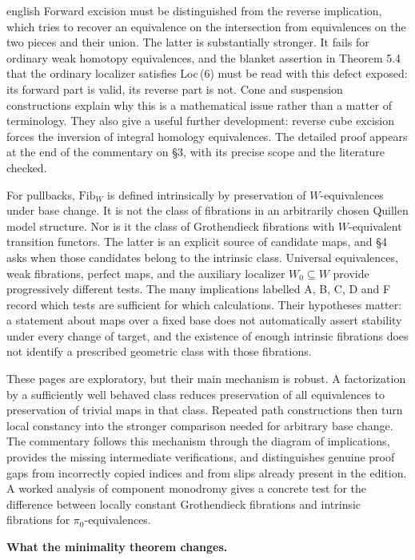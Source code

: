 \begin{otherlanguage*}{english}
Forward excision must be distinguished from the reverse implication, which tries to recover an equivalence on the intersection from equivalences on the two pieces and their union. The latter is substantially stronger. It fails for ordinary weak homotopy equivalences, and the blanket assertion in Theorem 5.4 that the ordinary localizer satisfies Loc\,(6) must be read with this defect exposed: its forward part is valid, its reverse part is not. Cone and suspension constructions explain why this is a mathematical issue rather than a matter of terminology. They also give a useful further development: reverse cube excision forces the inversion of integral homology equivalences. The detailed proof appears at the end of the commentary on \S3, with its precise scope and the literature checked.

For pullbacks, $\mathrm{Fib}_W$ is defined intrinsically by preservation of $W$-equivalences under base change. It is not the class of fibrations in an arbitrarily chosen Quillen model structure. Nor is it the class of Grothendieck fibrations with $W$-equivalent transition functors. The latter is an explicit source of candidate maps, and \S4 asks when those candidates belong to the intrinsic class. Universal equivalences, weak fibrations, perfect maps, and the auxiliary localizer $W_0\subseteq W$ provide progressively different tests. The many implications labelled A, B, C, D and F record which tests are sufficient for which calculations. Their hypotheses matter: a statement about maps over a fixed base does not automatically assert stability under every change of target, and the existence of enough intrinsic fibrations does not identify a prescribed geometric class with those fibrations.

These pages are exploratory, but their main mechanism is robust. A factorization by a sufficiently well behaved class reduces preservation of all equivalences to preservation of trivial maps in that class. Repeated path constructions then turn local constancy into the stronger comparison needed for arbitrary base change. The commentary follows this mechanism through the diagram of implications, provides the missing intermediate verifications, and distinguishes genuine proof gaps from incorrectly copied indices and from slips already present in the edition. A worked analysis of component monodromy gives a concrete test for the difference between locally constant Grothendieck fibrations and intrinsic fibrations for $\pi_0$-equivalences.

\medskip\noindent\textbf{What the minimality theorem changes.}


\end{otherlanguage*}
